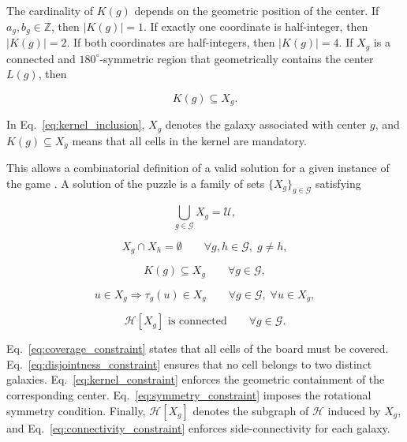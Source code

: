 The cardinality of \(K(g)\) depends on the geometric position of the center. If \(a_g,b_g \in \mathbb{Z}\), then \(|K(g)|=1\). If exactly one coordinate is half-integer, then \(|K(g)|=2\). If both coordinates are half-integers, then \(|K(g)|=4\). If \(X_g\) is a connected and \(180^\circ\)-symmetric region that geometrically contains the center \(L(g)\), then

\begin{equation}
K(g) \subseteq X_g.
\label{eq:kernel_inclusion}
\end{equation}

In Eq.~\ref{eq:kernel_inclusion}, \(X_g\) denotes the galaxy associated with center \(g\), and \(K(g) \subseteq X_g\) means that all cells in the kernel are mandatory.

This allows a combinatorial definition of a valid solution for a given instance of the game \cite{fertin2015}. A solution of the puzzle is a family of sets \(\{X_g\}_{g \in \mathcal{G}}\) satisfying

\begin{equation}
\bigcup_{g \in \mathcal{G}} X_g = \mathcal{U},
\label{eq:coverage_constraint}
\end{equation}

\begin{equation}
X_g \cap X_h = \emptyset 
\qquad \forall g,h \in \mathcal{G}, \; g \neq h,
\label{eq:disjointness_constraint}
\end{equation}

\begin{equation}
K(g) \subseteq X_g 
\qquad \forall g \in \mathcal{G},
\label{eq:kernel_constraint}
\end{equation}

\begin{equation}
u \in X_g \Rightarrow \tau_g(u) \in X_g
\qquad \forall g \in \mathcal{G}, \; \forall u \in X_g,
\label{eq:symmetry_constraint}
\end{equation}

\begin{equation}
\mathcal{H}[X_g] \text{ is connected}
\qquad \forall g \in \mathcal{G}.
\label{eq:connectivity_constraint}
\end{equation}

Eq.~\ref{eq:coverage_constraint} states that all cells of the board must be covered. Eq.~\ref{eq:disjointness_constraint} ensures that no cell belongs to two distinct galaxies. Eq.~\ref{eq:kernel_constraint} enforces the geometric containment of the corresponding center. Eq.~\ref{eq:symmetry_constraint} imposes the rotational symmetry condition. Finally, \(\mathcal{H}[X_g]\) denotes the subgraph of \(\mathcal{H}\) induced by \(X_g\), and Eq.~\ref{eq:connectivity_constraint} enforces side-connectivity for each galaxy.

